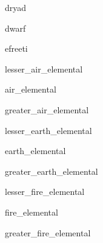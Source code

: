 \documentclass[letterpaper,serif]{module}
\begin{document}
\begin{newmonster}{dryad}\end{newmonster}

\begin{newmonster}{dwarf}\end{newmonster}

\begin{newmonster}{efreeti}\end{newmonster}


\begin{newmonster}{lesser_air_elemental}\end{newmonster}

\begin{newmonster}{air_elemental}\end{newmonster}

\begin{newmonster}{greater_air_elemental}\end{newmonster}

\begin{newmonster}{lesser_earth_elemental}\end{newmonster}

\begin{newmonster}{earth_elemental}\end{newmonster}

\begin{newmonster}{greater_earth_elemental}\end{newmonster}

\begin{newmonster}{lesser_fire_elemental}\end{newmonster}

\begin{newmonster}{fire_elemental}\end{newmonster}

\begin{newmonster}{greater_fire_elemental}\end{newmonster}
\end{document}
